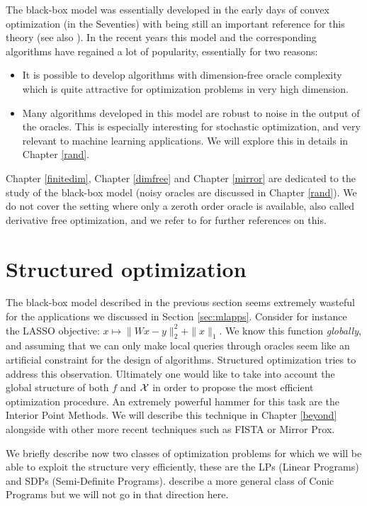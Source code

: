 The black-box model was essentially developed in the early days of convex optimization (in the Seventies) with \cite{NY83} being still an important reference for this theory (see also \cite{Nem95}). In the recent years this model and the corresponding algorithms have regained a lot of popularity, essentially for two reasons:
\begin{itemize}
\item It is possible to develop algorithms with dimension-free oracle complexity which is quite attractive for optimization problems in very high dimension.
\item Many algorithms developed in this model are robust to noise in the output of the oracles. This is especially interesting for stochastic optimization, and very relevant to machine learning applications. We will explore this in details in Chapter \ref{rand}.
\end{itemize}
Chapter \ref{finitedim}, Chapter \ref{dimfree} and Chapter \ref{mirror} are dedicated to the study of the black-box model (noisy oracles are discussed in Chapter \ref{rand}). We do not cover the setting where only a zeroth order oracle is available, also called derivative free optimization, and we refer to \cite{CSV09, ABM11} for further references on this.

\section{Structured optimization} \label{sec:structured}
The black-box model described in the previous section seems extremely wasteful for the applications we discussed in Section \ref{sec:mlapps}. Consider for instance the LASSO objective: $x \mapsto \|W x - y\|_2^2 + \|x\|_1$. We know this function {\em globally}, and assuming that we can only make local queries through oracles seem like an artificial constraint for the design of algorithms. Structured optimization tries to address this observation. Ultimately one would like to take into account the global structure of both $f$ and $\mathcal{X}$ in order to propose the most efficient optimization procedure. An extremely powerful hammer for this task are the Interior Point Methods. We will describe this technique in Chapter \ref{beyond} alongside with other more recent techniques such as FISTA or Mirror Prox. 

We briefly describe now two classes of optimization problems for which we will be able to exploit the structure very efficiently, these are the LPs (Linear Programs) and SDPs (Semi-Definite Programs). \cite{BN01} describe a more general class of Conic Programs but we will not go in that direction here.

